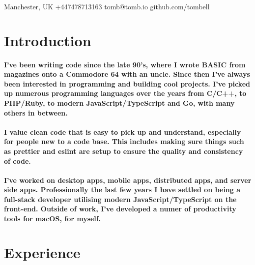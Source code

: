 \documentclass[a4paper]{article}
\author{Tom Bell}
\renewcommand{\maketitle}{
  \begin{center}
    \huge{\textbf\theauthor}
  \end{center}
}
\begin{document}
\maketitle

\begin{center}
  \raisebox{0\height}{\small\faMapMarker} Manchester, UK
  \hspace{1cm}
  \raisebox{-0.1\height}{\small\faMobile} +447478713163
  \hspace{1cm}
  \raisebox{-0.1\height}{\small\faEnvelope} tomb@tomb.io
  \hspace{1cm}
  \raisebox{-0.1\height}{\small\faGithubAlt} github.com/tombell
\end{center}

\section{Introduction}
\paragraph{I've been writing code since the late 90's, where I wrote BASIC from
magazines onto a Commodore 64 with an uncle. Since then I've always been
interested in programming and building cool projects. I've picked up numerous
programming languages over the years from C/C++, to PHP/Ruby, to modern
JavaScript/TypeScript and Go, with many others in between.}

\paragraph{I value clean code that is easy to pick up and understand, especially
for people new to a code base. This includes making sure things such as prettier
and eslint are setup to ensure the quality and consistency of code.}

\paragraph{I've worked on desktop apps, mobile apps, distributed apps, and
server side apps. Professionally the last few years I have settled on being a
full-stack developer utilising modern JavaScript/TypeScript on the front-end.
Outside of work, I've developed a numer of productivity tools for macOS, for
myself.}

\section{Experience}
\end{document}
